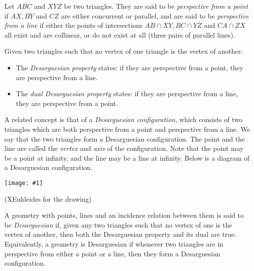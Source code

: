 \documentclass{article}
\newcommand{\figuraex}[2]{\begin{center}\texttt{[image: \#1]}\end{center}}
\begin{document}
Let $ABC$ and $XYZ$ be two triangles.  They are said to be \emph{perspective from a point} if $AX,BY$ and $CZ$ are either concurrent or parallel, and are said to be \emph{perspective from a line} if either the points of intersections $AB \cap XY, BC\cap YZ$ and $CA \cap ZX$ all exist and are collinear, or do not exist at all (three pairs of parallel lines).

Given two triangles such that no vertex of one triangle is the vertex of another:
\begin{itemize}
\item The \emph{Desarguesian property} states: if they are perspective from a point, they are perspective from a line.
\item The \emph{dual Desarguesian property} states: if they are perspective from a line, they are perspective from a point.
\end{itemize}

A related concept is that of a \emph{Desarguesian configuration}, which consists of two triangles which are both perspective from a point and perspective from a line.  We say that the two triangles form a Desarguesian configuration.  The point and the line are called the \emph{vertex} and \emph{axis} of the configuration.  Note that the point may be a point at infinity, and the line may be a line at infinity.  Below is a diagram of a Desarguesian configuration.



\figuraex{desargues}{scale=0.75}
{\footnotesize(XEukleides  for the drawing)}

A geometry with points, lines and an incidence relation between them is said to be \emph{Desarguesian} if, given any two triangles such that no vertex of one is the vertex of another, then both the Desarguesian property and its dual are true.  Equivalently, a geometry is Desarguesian if whenever two triangles are in perspective from either a point or a line, then they form a Desarguesian configuration.
\end{document}
